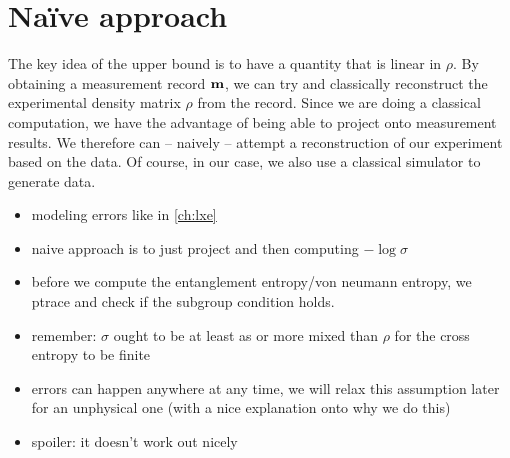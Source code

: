 \section{Na\"ive approach}\label{sec:naive-approach}
The key idea of the upper bound is to have a quantity that is linear in $\rho$.
By obtaining a measurement record $\vb{m}$, we can try and classically
reconstruct the experimental density matrix $\rho$ from the record. Since we
are doing a classical computation, we have the advantage of being able to
project onto measurement results. We therefore can -- naively -- attempt a
reconstruction of our experiment based on the data. Of course, in our case, we
also use a classical simulator to generate data. 
\begin{itemize}
  \item modeling errors like in \cref{ch:lxe}
  \item naive approach is to just project and then computing $-\log\sigma$
  \item before we compute the entanglement entropy/von neumann entropy, we
    ptrace and check if the subgroup condition holds.
  \item remember: $\sigma$ ought to be at least as or more mixed than $\rho$
    for the cross entropy to be finite
  \item errors can happen anywhere at any time, we will relax this assumption
    later for an unphysical one (with a nice explanation onto why we do this)
  \item spoiler: it doesn't work out nicely
\end{itemize}

